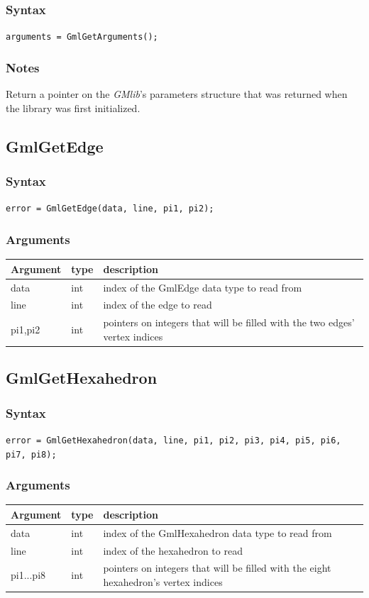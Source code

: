 \documentclass[a4paper,12pt]{article}
\begin{document}
\subsubsection*{Syntax}
{\tt arguments = GmlGetArguments();}
\subsubsection*{Notes}
Return a pointer on the \emph{GMlib}'s parameters structure that was returned when the library was first initialized.


\subsection{GmlGetEdge}
\subsubsection*{Syntax}
{\tt error = GmlGetEdge(data, line, pi1, pi2);}
\subsubsection*{Arguments}

\begin{tabular}{|m{2cm}|m{1.5cm}|m{10.5cm}|}
\hline
Argument   & type   & description \\
\hline
data       & int    & index of the GmlEdge data type to read from \\
\hline
line       & int    & index of the edge to read \\
\hline
pi1,pi2    & int    & pointers on integers that will be filled with the two edges' vertex indices \\
\hline
\end{tabular}


\subsection{GmlGetHexahedron}
\subsubsection*{Syntax}
{\tt error = GmlGetHexahedron(data, line, pi1, pi2, pi3, pi4, pi5, pi6, pi7, pi8);}
\subsubsection*{Arguments}

\begin{tabular}{|m{2cm}|m{1.5cm}|m{10.5cm}|}
\hline
Argument   & type   & description \\
\hline
data       & int    & index of the GmlHexahedron data type to read from \\
\hline
line       & int    & index of the hexahedron to read \\
\hline
pi1...pi8  & int    & pointers on integers that will be filled with the eight hexahedron's vertex indices \\
\hline
\end{tabular}
\end{document}
